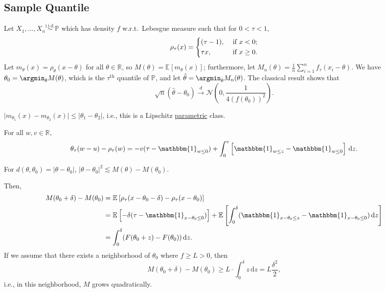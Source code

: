 \subsection{Sample Quantile}
Let \(X_1, \dots , X_n \overset{\text{i.i.d.} }{\sim } \mathbb{P} \)  which has density \(f\) w.r.t.\ Lebesgue measure such that for \(0 < \tau < 1\),
\[
	\rho _{\tau } (x) = \begin{dcases}
		(\tau -1 ), & \text{ if } x < 0 ;    \\
		\tau x,     & \text{ if } x \geq 0 .
	\end{dcases}
\]
Let \(m_\theta (x) = \rho _\theta (x - \theta )\) for all \(\theta \in \mathbb{R} \), so \(M(\theta )= \mathbb{E}_{}\left[m_\theta (x) \right] \); furthermore, let \(M_n(\theta ) = \frac{1}{n} \sum_{i=1}^{n} f_{\tau } (x_i - \theta )\). We have \(\theta _0 = \argmin_{\theta } M(\theta )\), which is the \(\tau ^{\text{th} }\) quantile of \(\mathbb{P} \), and let \(\hat{\theta} = \argmin_{\theta } M_n(\theta )\). The classical result shows that
\[
	\sqrt{n} (\hat{\theta} - \theta _0) \overset{d}{\to } \mathcal{N} \left( 0, \frac{1}{4 ( f(\theta _0) )^2} \right).
\]

\begin{claim}
	\(\vert m_{\theta _1}(x) - m_{\theta _2}(x) \vert \leq \vert \theta _1 - \theta _2 \vert \), i.e., this is a Lipschitz \hyperref[def:parametric]{parametric} class.
\end{claim}

\begin{lemma}
	For all \(w, v\in \mathbb{R} \),
	\[
		\theta _\tau (w - u) - \rho _\tau (w) = - v(\tau - \mathbbm{1}_{w \leq 0} ) + \int_{0}^{v} \left[ \mathbbm{1}_{w \leq z} - \mathbbm{1}_{w \leq 0}  \right]  \,\mathrm{d}z .
	\]
\end{lemma}

\begin{claim}
	For \(d(\theta , \theta _0) = \vert \theta - \theta _0 \vert \), \(\vert \theta - \theta _0 \vert ^2 \lesssim M(\theta ) - M(\theta _0)\).
\end{claim}

Then,
\[
	\begin{split}
		M(\theta _0 + \delta ) - M(\theta _0)
		&= \mathbb{E}_{}\left[\rho _\tau (x - \theta _0 - \delta ) - \rho _\tau (x - \theta _0) \right] \\
		&= \mathbb{E}_{}\left[-\delta (\tau - \mathbbm{1}_{x - \theta _0 \leq 0} ) \right] + \mathbb{E}_{}\left[\int_{0}^{\delta } ( \mathbbm{1}_{x - \theta _0 \leq z} - \mathbbm{1}_{x - \theta _0 \leq 0} ) \,\mathrm{d}z \right] \\
		&= \int_{0}^{\delta } (F(\theta _0 + z) - F(\theta _0)) \,\mathrm{d}z.
	\end{split}
\]
If we assume that there exists a neighborhood of \(\theta _0\) where \(f \geq L > 0\), then
\[
	M(\theta _0 + \delta ) - M(\theta _0)
	\geq L\cdot \int_{0}^{\delta } z \,\mathrm{d}z
	= L \frac{\delta ^2}{2},
\]
i.e., in this neighborhood, \(M\) grows quadratically.

